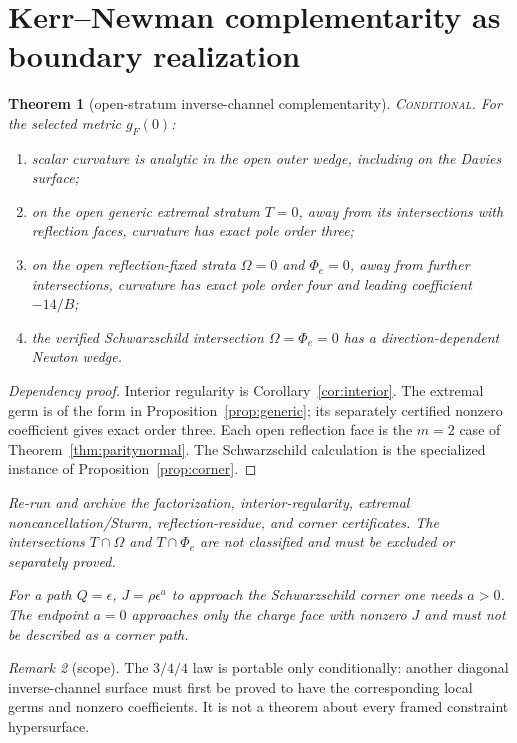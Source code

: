 \documentclass[11pt]{article}
\newtheorem{theorem}{Theorem}[section]
\theoremstyle{remark}
\newtheorem{remark}[theorem]{Remark}
\newcommand{\status}[1]{\textup{\textsc{#1}}}
\newcommand{\conditional}{\status{Conditional}}
\newcommand{\proofstop}[1]{\par\medskip\noindent{\color{red!75!black}\textbf{STOP--PROOF.}} \textit{#1}\par\medskip}
\begin{document}
\section{Kerr--Newman complementarity as boundary realization}

\begin{theorem}[open-stratum inverse-channel complementarity]
\label{thm:344}
\conditional.
For the selected metric $g_F(0)$:
\begin{enumerate}[label=(\roman*)]
\item scalar curvature is analytic in the open outer wedge, including on
the Davies surface;
\item on the open generic extremal stratum $T=0$, away from its
intersections with reflection faces, curvature has exact pole order three;
\item on the open reflection-fixed strata $\Omega=0$ and $\Phi_e=0$,
away from further intersections, curvature has exact pole order four and
leading coefficient $-14/B$;
\item the verified Schwarzschild intersection
$\Omega=\Phi_e=0$ has a direction-dependent Newton wedge.
\end{enumerate}
\end{theorem}

\begin{proof}[Dependency proof]
Interior regularity is Corollary~\ref{cor:interior}. The extremal germ is
of the form in Proposition~\ref{prop:generic}; its separately certified
nonzero coefficient gives exact order three. Each open reflection face is
the $m=2$ case of Theorem~\ref{thm:paritynormal}. The Schwarzschild
calculation is the specialized instance of Proposition~\ref{prop:corner}.
\end{proof}

\proofstop{Re-run and archive the factorization, interior-regularity,
extremal noncancellation/Sturm, reflection-residue, and corner certificates.
The intersections $T\cap\Omega$ and $T\cap\Phi_e$ are not
classified and must be excluded or separately proved.}

\proofstop{For a path $Q=\epsilon$, $J=\rho\epsilon^a$ to approach
the Schwarzschild corner one needs $a>0$. The endpoint $a=0$ approaches only
the charge face with nonzero $J$ and must not be described as a corner path.}

\begin{remark}[scope]
The $3/4/4$ law is portable only conditionally: another diagonal
inverse-channel surface must first be proved to have the corresponding local
germs and nonzero coefficients. It is not a theorem about every framed
constraint hypersurface.
\end{remark}
\end{document}
